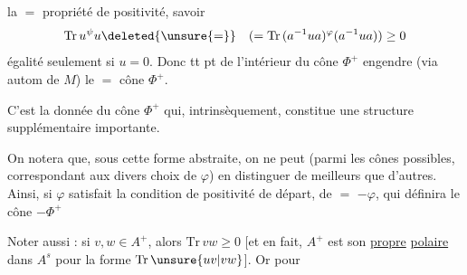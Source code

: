la $=$ propriété de positivité, savoir
\[
\mathrm{Tr}\,u^\psi u\deleted{\unsure{=}}\quad(=\mathrm{Tr}\,(a^{-1}ua)^\varphi(a^{-1}ua))\geq0
\]
égalité seulement si $u=0$. Donc tt pt de
l'intérieur du cône  $\Phi^+$ engendre
(via autom de $M$) le $=$ cône $\Phi^+$.

C'est la donnée du cône $\Phi^+$ qui,
intrinsèquement, constitue une structure
supplémentaire importante.

On notera que, sous cette forme abstraite,
on ne peut (parmi les cônes possibles,
correspondant aux divers choix de $\varphi$)
en distinguer de meilleurs que d'autres.
Ainsi, si $\varphi$ satisfait la condition de
positivité de départ, de $=$ $-\varphi$, qui
définira le cône $-\Phi^+$

Noter aussi :  si $v,w\in A^+$,
alors $\mathrm{Tr}\,vw\geq0$ [et
en fait, $A^+$ est son \uline{propre} \uline{polaire} dans
$A^s$  pour la forme $\mathrm{Tr}\,\unsure{uv|vw}$]. Or pour

